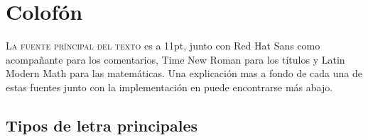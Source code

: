 \chapter{Colofón}%
\label{cha:Colofón}

	\textsc{La fuente príncipal del texto} es  a 11pt, junto con Red Hat Sans como acompañante para los comentarios,
	Time New Roman para los títulos y Latin Modern Math para las matemáticas. Una explicación mas a fondo de cada una de estas fuentes
	junto con la implementación en \LuaLaTeX{} puede encontrarse más abajo.

\section*{Tipos de letra principales}%
\label{sec:Tipos de letra principales}

